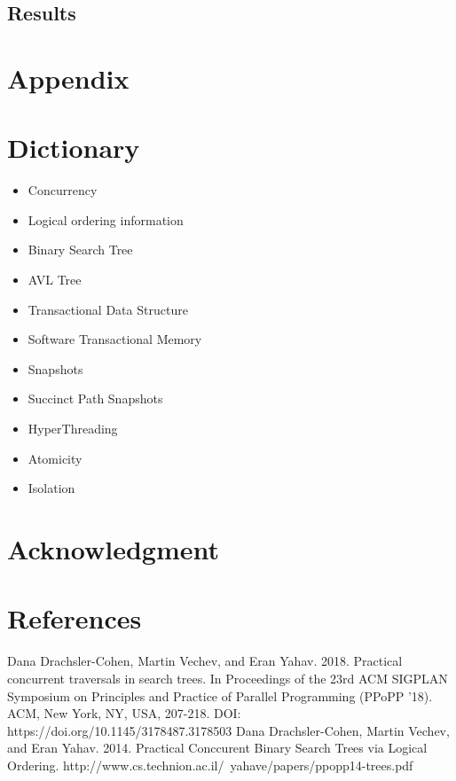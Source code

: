 \documentclass[conference]{IEEEtran}
\begin{document}
\subsection{Results}


\section{Appendix}

\section{Dictionary}
\begin{itemize}[label=$\ast$]
	\item Concurrency
	\item Logical ordering information
	\item Binary Search Tree
	\item AVL Tree
	\item Transactional Data Structure
	\item Software Transactional Memory
	\item Snapshots
	\item Succinct Path Snapshots
	\item HyperThreading
	\item Atomicity 
	\item Isolation
\end{itemize}

\section*{Acknowledgment}

\section*{References}




\begin{thebibliography}{00}
 Dana Drachsler-Cohen, Martin Vechev, and Eran Yahav. 2018. Practical concurrent traversals in search trees. In Proceedings of the 23rd ACM SIGPLAN Symposium on Principles and Practice of Parallel Programming (PPoPP '18). ACM, New York, NY, USA, 207-218. DOI: https://doi.org/10.1145/3178487.3178503
 Dana Drachsler-Cohen, Martin Vechev, and Eran Yahav. 2014. Practical Conccurent Binary Search Trees via Logical Ordering. http://www.cs.technion.ac.il/~yahave/papers/ppopp14-trees.pdf

\end{thebibliography}
\end{document}
